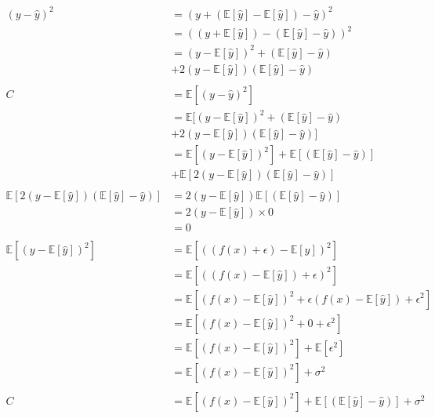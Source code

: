 \documentclass[a4paper, UKenglish]{article}
\newcommand{\0}{\mathbf{0}}
\newcommand{\1}{\mathbf{1}}
\begin{document}
\begin{align*}
(y - \hat{y})^2 &= (y + (\mathbb{E}[\hat{y}] - \mathbb{E}[\hat{y}]) -\hat{y})^2
\\&= ((y + \mathbb{E}[\hat{y}]) - (\mathbb{E}[\hat{y}] -\hat{y}))^2
\\&= (y- \mathbb{E}[\hat{y}])^2 + (\mathbb{E}[\hat{y}] - \hat{y}) \\&+ 2(y - \mathbb{E}[\hat{y}])(\mathbb{E}[\hat{y}] - \hat{y})
\\\\
C &= \mathbb{E}[(y - \hat{y})^2]
\\&= \mathbb{E}[(y- \mathbb{E}[\hat{y}])^2 + (\mathbb{E}[\hat{y}] - \hat{y}) \\&+ 2(y - \mathbb{E}[\hat{y}])(\mathbb{E}[\hat{y}] - \hat{y})]
\\&= \mathbb{E}[(y- \mathbb{E}[\hat{y}])^2] + \mathbb{E}[(\mathbb{E}[\hat{y}] - \hat{y})] \\&+ \mathbb{E}[2(y - \mathbb{E}[\hat{y}])(\mathbb{E}[\hat{y}] - \hat{y})]
\\\\
\mathbb{E}[2(y - \mathbb{E}[\hat{y}])(\mathbb{E}[\hat{y}] - \hat{y})]&=2(y - \mathbb{E}[\hat{y}])\mathbb{E}[(\mathbb{E}[\hat{y}] - \hat{y})]
\\&= 2(y - \mathbb{E}[\hat{y}])\times 0
\\&=0
\\\\
\mathbb{E}[(y- \mathbb{E}[\hat{y}])^2] &= \mathbb{E}[((f(x) + \epsilon) - \mathbb{E}[\hat{y}])^2]
\\&= \mathbb{E}[((f(x) - \mathbb{E}[\hat{y}]) + \epsilon)^2]
\\&= \mathbb{E}[(f(x) - \mathbb{E}[\hat{y}])^2 + \epsilon(f(x) -\mathbb{E}[\hat{y}]) + \epsilon^2]
\\&= \mathbb{E}[(f(x) - \mathbb{E}[\hat{y}])^2 + 0 + \epsilon^2]
\\&= \mathbb{E}[(f(x) - \mathbb{E}[\hat{y}])^2] + \mathbb{E}[\epsilon^2]
\\&= \mathbb{E}[(f(x) - \mathbb{E}[\hat{y}])^2] + \sigma^2
\\\\
C &= \mathbb{E}[(f(x) - \mathbb{E}[\hat{y}])^2] + \mathbb{E}[(\mathbb{E}[\hat{y}] - \hat{y})] + \sigma^2
\end{align*}
\end{document}
